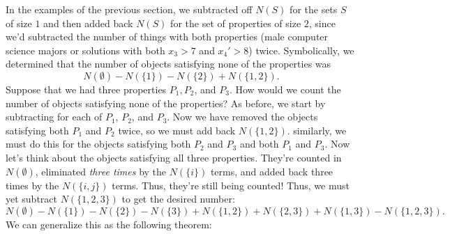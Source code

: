 In the examples of the previous section, we subtracted off $N(S)$ for
the sets $S$ of size $1$ and then added back $N(S)$ for the set of
properties of size $2$, since we'd subtracted the number of things
with both properties (male computer science majors or solutions with
both $x_3>7$ and $x_4'>8$) twice. Symbolically, we determined that the
number of objects satisfying none of the properties was
\[N(\emptyset) - N(\{1\}) - N(\{2\}) + N(\{1,2\}).\] Suppose that we
had three properties $P_1,P_2$, and $P_3$. How would we count the
number of objects satisfying none of the properties?  As before, we
start by subtracting for each of $P_1$, $P_2$, and $P_3$. Now we have
removed the objects satisfying both $P_1$ and $P_2$ twice, so we must
add back $N(\{1,2\})$. similarly, we must do this for the objects
satisfying both $P_2$ and $P_3$ and both $P_1$ and $P_3$. Now let's
think about the objects satisfying all three properties. They're
counted in $N(\emptyset)$, eliminated \emph{three times} by the
$N(\{i\})$ terms, and added back three times by the $N(\{i,j\})$
terms. Thus, they're still being counted! Thus, we must yet
subtract $N(\{1,2,3\})$ to get the desired number:
\[N(\emptyset) - N(\{1\}) - N(\{2\}) - N(\{3\}) + N(\{1,2\}) +
N(\{2,3\}) + N(\{1,3\}) - N(\{1,2,3\}).\]
We can generalize this as the following theorem:

